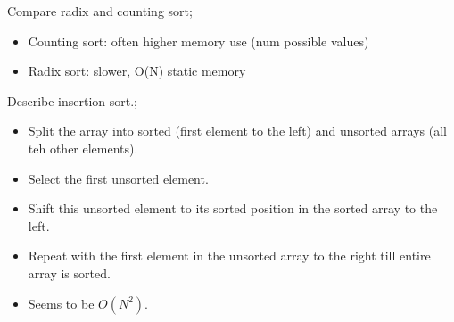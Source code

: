 \documentclass{article}
\begin{document}
Compare radix and counting sort; \begin{itemize}
    \item Counting sort: often higher memory use (num possible values)
    \item Radix sort: slower, O(N) static memory 
\end{itemize}

Describe insertion sort.; \begin{itemize}
    \item Split the array into sorted (first element to the left) and unsorted arrays (all teh other elements).
    \item Select the first unsorted element.
    \item Shift this unsorted element to its sorted position in the sorted array to the left.
    \item Repeat with the first element in the unsorted array to the right till entire array is sorted.
    \item Seems to be $O(N^2)$.
\end{itemize}
\end{document}
